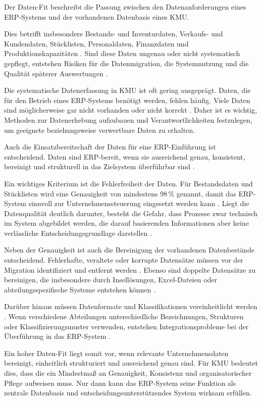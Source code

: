 Der Daten-Fit beschreibt die Passung zwischen den Datenanforderungen eines ERP-Systems 
und der vorhandenen Datenbasis eines KMU. 

Dies betrifft insbesondere Bestands- und Inventurdaten, Verkaufs- und Kundendaten, Stücklisten, Personaldaten, 
Finanzdaten und Produktionskapazitäten \parencite{Jha2008,Xia2009,Alaskari2021,Leyh2017}. 
Sind diese Daten ungenau oder nicht systematisch gepflegt, entstehen Risiken für die Datenmigration, die Systemnutzung und die Qualität 
späterer Auswertungen \parencite{Jha2008,Leyh2017}. 

Die systematische Datenerfassung in KMU ist oft gering ausgeprägt. Daten, die für den Betrieb
eines ERP-Systems benötigt werden, fehlen häufig. Viele Daten sind
möglicherweise gar nicht vorhanden oder nicht korrekt \parencite{Jha2008}. Daher ist es wichtig,
Methoden zur Datenerhebung aufzubauen und Verantwortlichkeiten festzulegen, um
geeignete beziehungsweise verwertbare Daten zu erhalten.

Auch die Einsatzbereitschaft der Daten
für eine ERP-Einführung ist entscheidend. Daten sind ERP-bereit, wenn sie ausreichend
genau, konsistent, bereinigt und strukturell in das Zielsystem überführbar
sind \parencite{Jha2008,Leyh2017}. 

Ein wichtiges Kriterium ist die Fehlerfreiheit der Daten. Für Bestandsdaten und
Stücklisten wird eine Genauigkeit von mindestens 98\,\% genannt, damit das
ERP-System sinnvoll zur Unternehmenssteuerung eingesetzt werden kann
\parencite{Jha2008}. Liegt die Datenqualität deutlich darunter, besteht die
Gefahr, dass Prozesse zwar technisch im System abgebildet werden, die darauf
basierenden Informationen aber keine verlässliche Entscheidungsgrundlage
darstellen \parencite{Jha2008,Leyh2015}.

Neben der Genauigkeit ist auch die Bereinigung der vorhandenen Datenbestände
entscheidend. Fehlerhafte, veraltete oder korrupte Datensätze müssen vor der
Migration identifiziert und entfernt werden \parencite{Alaskari2021}. Ebenso sind doppelte Datensätze
zu bereinigen, die insbesondere durch Insellösungen, Excel-Dateien oder
abteilungsspezifische Systeme entstehen können \parencite{Alaskari2021}.

Darüber hinaus müssen Datenformate und Klassifikationen vereinheitlicht
werden \parencite{Leyh2015}. Wenn verschiedene Abteilungen unterschiedliche Bezeichnungen,
Strukturen oder Klassifizierungsmuster verwenden, entstehen
Integrationsprobleme bei der Überführung in das ERP-System \parencite{Alaskari2021}. 

Ein hoher Daten-Fit liegt somit vor, wenn relevante Unternehmensdaten
bereinigt, einheitlich strukturiert und ausreichend genau sind. Für KMU bedeutet dies, dass die ein Mindestmaß an
Genauigkeit, Konsistenz und organisatorischer Pflege aufweisen muss. Nur dann
kann das ERP-System seine Funktion als zentrale Datenbasis und
entscheidungsunterstützendes System wirksam erfüllen.


